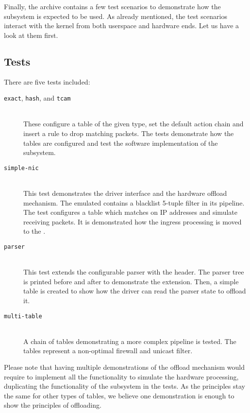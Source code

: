 Finally, the archive contains a few test scenarios to demonstrate how the
subsystem is expected to be used. As already mentioned, the test scenarios
interact with the kernel from both userspace and hardware ends. Let us have
a look at them first.

\subsection{Tests}

There are five tests included:

\begin{description}
	\item[\texttt{exact}, \texttt{hash}, and \texttt{tcam}] \hfill \\
		These configure a table of the given type, set the default action chain
		and insert a rule to drop matching packets. The tests demonstrate how
		the tables are configured and test the software implementation of the
		subsystem.

	\item[\texttt{simple-nic}] \hfill \\
		This test demonstrates the driver interface and the hardware offload
		mechanism. The emulated  contains a blacklist 5-tuple filter in
		its pipeline. The test configures a table which matches on IP addresses
		and simulate receiving packets. It is demonstrated how the ingress
		processing is moved to the .

	\item[\texttt{parser}] \hfill \\
		This test extends the configurable parser with the  header.
		The parser tree is printed before and after to demonstrate the
		extension. Then, a simple table is created to show how the driver can
		read the parser state to offload it.

	\item[\texttt{multi-table}] \hfill \\
		A chain of tables demonstrating a more complex pipeline is tested.
		The tables represent a non-optimal firewall and unicast  filter.
\end{description}

\noindent Please note that having multiple demonstrations of the offload
mechanism would require to implement all the functionality to simulate the
hardware processing, duplicating the functionality of the subsystem in the
tests. As the principles stay the same for other types of tables, we believe
one demonstration is enough to show the principles of offloading.

